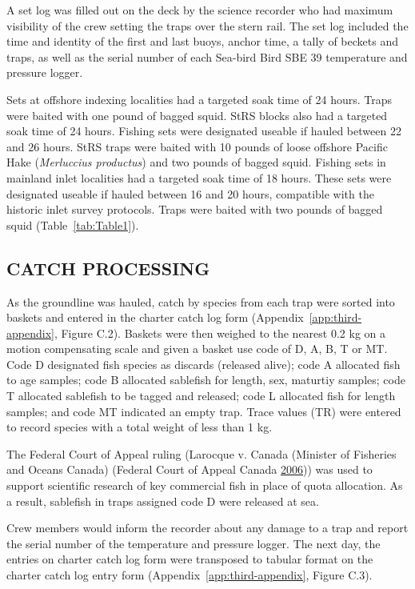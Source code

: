 \documentclass[12pt]{article}\usepackage[]{graphicx}\usepackage[]{color}
\begin{document}
A set log was filled out on the deck by the science recorder who had maximum visibility of the crew setting the traps over the stern rail. The set log included the time and identity of the first and last buoys, anchor time, a tally of beckets and traps, as well as the serial number of each Sea-bird Bird SBE 39 temperature and pressure logger.

Sets at offshore indexing localities had a targeted soak time of 24 hours. Traps were baited with one pound of bagged squid. StRS blocks also had a targeted soak time of 24 hours. Fishing sets were designated useable if hauled between 22 and 26 hours. StRS traps were baited with 10 pounds of loose offshore Pacific Hake (\emph{Merluccius productus}) and two pounds of bagged squid. Fishing sets in mainland inlet localities had a targeted soak time of 18 hours. These sets were designated useable if hauled between 16 and 20 hours, compatible with the historic inlet survey protocols. Traps were baited with two pounds of bagged squid (Table~\ref{tab:Table1}).

\hypertarget{catch-processing}{%
\subsection{CATCH PROCESSING}\label{catch-processing}}

As the groundline was hauled, catch by species from each trap were sorted into baskets and entered in the charter catch log form (Appendix~\ref{app:third-appendix}, Figure C.2). Baskets were then weighed to the nearest 0.2 kg on a motion compensating scale and given a basket use code of D, A, B, T or MT. Code D designated fish species as discards (released alive); code A allocated fish to age samples; code B allocated sablefish for length, sex, maturtiy samples; code T allocated sablefish to be tagged and released; code L allocated fish for length samples; and code MT indicated an empty trap. Trace values (TR) were entered to record species with a total weight of less than 1 kg.

The Federal Court of Appeal ruling (Larocque v. Canada (Minister of Fisheries and Oceans Canada) (Federal Court of Appeal Canada \protect\hyperlink{ref-Larocque2006}{2006})) was used to support scientific research of key commercial fish in place of quota allocation. As a result, sablefish in traps assigned code D were released at sea.

Crew members would inform the recorder about any damage to a trap and report the serial number of the temperature and pressure logger. The next day, the entries on charter catch log form were transposed to tabular format on the charter catch log entry form (Appendix~\ref{app:third-appendix}, Figure C.3).
\end{document}
